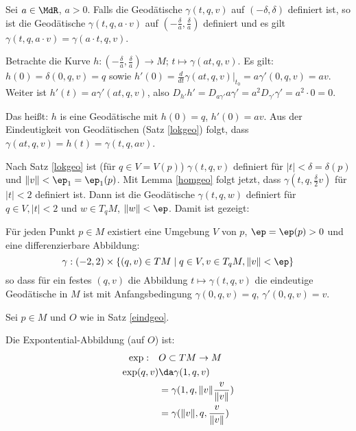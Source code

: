 \documentclass[a4paper,twoside,DIV15,BCOR12mm]{scrbook}
\begin{document}
\begin{lemma}
\label{homgeo}
Sei $a\in \MdR$, $a>0$. Falls die Geodätische $\gamma(t,q,v)$ auf $(-\delta,\delta)$ definiert ist, so ist die Geodätische $\gamma(t,q,a\cdot v)$ auf $(-\frac \delta a, \frac \delta a)$ definiert und es gilt $\gamma(t,q,a\cdot v) = \gamma(a\cdot t, q ,v)$.
\end{lemma}

\begin{beweis}
Betrachte die Kurve $h: (-\frac \delta a, \frac \delta a) \to M$; $t\mapsto \gamma(at,q,v)$. Es gilt: $h(0)= \delta(0,q,v) = q$ sowie $h'(0) = \frac d{dt}\gamma(at,q,v)|_{t_0} = a \gamma'(0,q,v) = av$. Weiter ist $h'(t) = a\gamma'(at,q,v)$, also $D_{h'}h' = D_{a\gamma'}a\gamma' = a^2 D_{\gamma'}\gamma' = a^2\cdot 0 = 0.$

Das heißt: $h$ is eine Geodätische mit $h(0) = q$, $h'(0)=av$. Aus der Eindeutigkeit von Geodätischen (Satz \ref{lokgeo}) folgt, dass $\gamma(at,q,v) = h(t) = \gamma(t,q,av)$.
\end{beweis}

Nach Satz \ref{lokgeo} ist (für $q\in V=V(p)$) $\gamma(t,q,v)$ definiert für $|t|<\delta=\delta(p)$ und $\|v\| < \ep_1=\ep_1(p)$. Mit Lemma \ref{homgeo} folgt jetzt, dass $\gamma(t,q,\frac \delta 2 v)$ für $|t|<2$ definiert ist. Dann ist die Geodätische $\gamma(t,q,w)$ definiert für $q\in V, |t|<2$ und $w\in T_qM$, $\|w\|<\ep$. Damit ist gezeigt: 
\begin{satz}
\label{eindgeo}
Für jeden Punkt $p\in M$ existiert eine Umgebung $V$ von $p$, $\ep = \ep(p)>0$ und eine differenzierbare Abbildung:
\[
\gamma: (-2,2) \times \{(q,v)\in TM \mid q\in V, v\in T_qM, \|v\| < \ep \}
\]
so dass für ein festes $(q,v)$ die Abbildung $t\mapsto \gamma(t,q,v)$ die eindeutige Geodätische in $M$ ist mit Anfangsbedingung $\gamma(0,q,v) = q$, $\gamma'(0,q,v) = v$.
\end{satz}

Sei $p\in M$ und $O$ wie in Satz \ref{eindgeo}.
\begin{definition}
Die Expontential-Abbildung (auf $O$) ist:
\begin{align*}
\exp :\quad &O \subset TM \to M\\
\exp(q,v) &\da \gamma(1,q,v) \\
&= \gamma(1,q,\|v\| \frac v {\|v\|}) \\
&= \gamma(\|v\|,q,\frac v {\|v\|})
\end{align*}
\end{definition}
\end{document}
